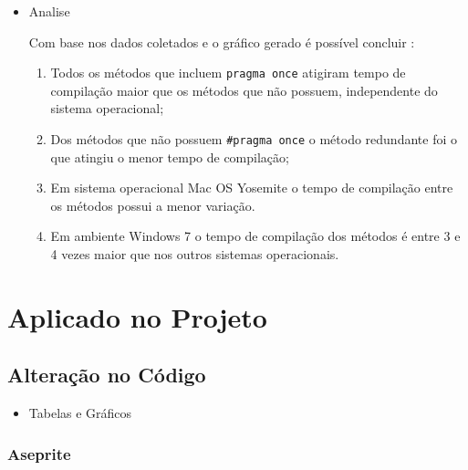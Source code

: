 \begin{itemize}
     \item Analise

    Com base nos dados coletados e o gráfico gerado é possível concluir :
    \begin{enumerate}
        \item Todos os métodos que incluem \texttt{pragma once} atigiram tempo de compilação maior que os métodos que não possuem, independente do sistema operacional;
        \item Dos métodos que não possuem \texttt{\#pragma once} o método redundante foi o que atingiu o menor tempo de compilação;
        \item Em sistema operacional Mac OS Yosemite o tempo de compilação entre os métodos possui a menor variação.
        \item Em ambiente Windows 7 o tempo de compilação dos métodos é entre 3 e 4 vezes maior que nos outros sistemas operacionais. 
    \end{enumerate}
\end{itemize}

\clearpage
\section{Aplicado no Projeto}

\subsection{Alteração no Código}\label{resultados_alteracao_de_codigo}

\begin{itemize}
    \item Tabelas e Gráficos

\end{itemize}

\subsubsection*{Aseprite}

